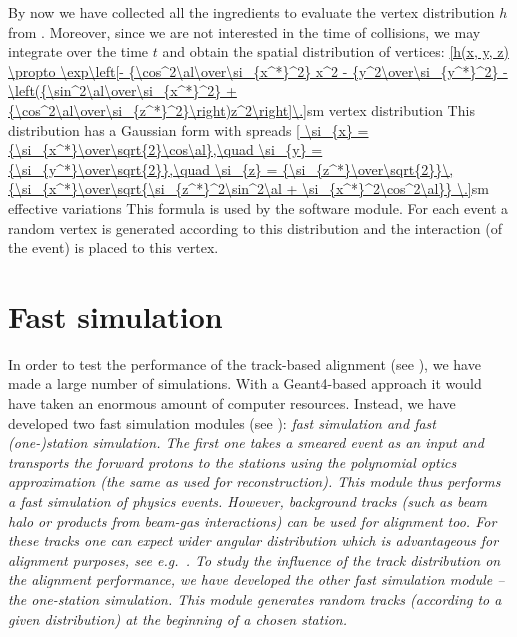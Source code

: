 By now we have collected all the ingredients to evaluate the vertex distribution $h$ from . Moreover, since we are not interested in the time of collisions, we may integrate over the time $t$ and obtain the spatial distribution of vertices:
\eqref{h(x, y, z) \propto \exp\left[- {\cos^2\al\over\si_{x^*}^2} x^2 - {y^2\over\si_{y^*}^2} - \left({\sin^2\al\over\si_{x^*}^2} + {\cos^2\al\over\si_{z^*}^2}\right)z^2\right]\.}{sm vertex distribution}
This distribution has a Gaussian form with spreads
\eqref{
	\si_{x} = {\si_{x^*}\over\sqrt{2}\cos\al},\quad
	\si_{y} = {\si_{y^*}\over\sqrt{2}},\quad
	\si_{z} = {\si_{z^*}\over\sqrt{2}}\,{\si_{x^*}\over\sqrt{\si_{z^*}^2\sin^2\al + \si_{x^*}^2\cos^2\al}} \.}{sm effective variations}
This formula is used by the software module. For each event a random vertex is generated according to this distribution and the interaction (of the event) is placed to this vertex.


\section[fast simu]{Fast simulation}

In order to test the performance of the track-based alignment (see ), we have made a large number of  simulations. With a Geant4-based approach it would have taken an enormous amount of computer resources. Instead, we have developed two fast simulation modules (see ): \em{fast simulation} and \em{fast (one-)station simulation}. The first one takes a smeared event as an input and transports the forward protons to the  stations using the polynomial optics approximation (the same as used for reconstruction). This module thus performs a fast simulation of physics events. However, background tracks (such as beam halo or products from beam-gas interactions) can be used for alignment too. For these tracks one can expect wider angular distribution which is advantageous for alignment purposes, see e.g.~. To study the influence of the track distribution on the alignment performance, we have developed the other fast simulation module -- the one-station simulation. This module generates random tracks (according to a given distribution) at the beginning of a chosen station.

